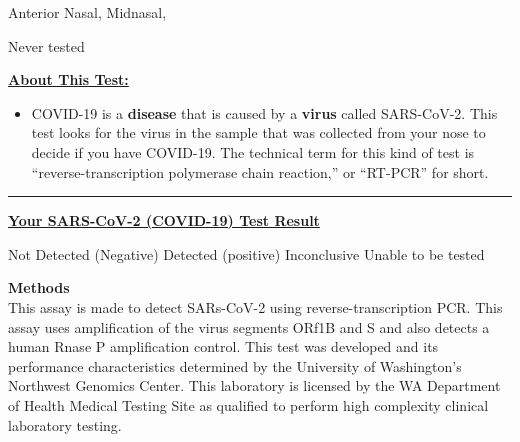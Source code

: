 \documentclass[10pt]{article}
\newcommand{\PageLine}{\rule{\textwidth}{0.25mm}}
\begin{document}
\begin{description}[font=\normalfont,align=left,labelwidth=12em]
\item [\textbf{Patient Name}] 
\item [\textbf{Date of Birth}] 
\item [\textbf{Ordering Provider}] 
\item [\textbf{Specimen}]
  Anterior Nasal,
  Midnasal,

\item [\textbf{Collection Barcode}] 
\item [\textbf{Collection Date}] 
\item [\textbf{Report Date}]
  Never tested
\end{description}

\bigskip

\large \underline{\textbf{About This Test:}}

\begin{itemize}
\item

  COVID-19 is a \textbf{disease} that is caused by a \textbf{virus} called
  SARS-CoV-2. This test looks for the virus in the sample that was
  collected from your nose to decide if you have COVID-19. The technical term
  for this kind of test is “reverse-transcription polymerase chain reaction,” or
  “RT-PCR” for short.

\end{itemize}

\bigskip

\PageLine

\large \underline{\textbf{Your SARS-CoV-2 (COVID-19) Test Result}}

Not Detected (Negative)
Detected (positive)
Inconclusive
Unable to be tested

\bigskip

\textbf{Methods}\\
This assay is made to detect SARs-CoV-2 using reverse-transcription PCR. This
assay uses amplification of the virus segments ORf1B and S and also detects a
human Rnase P amplification control. This test was developed and its performance
characteristics determined by the University of Washington’s Northwest Genomics
Center. This laboratory is licensed by the WA Department of Health Medical
Testing Site as qualified to perform high complexity clinical laboratory
testing.
\end{document}
